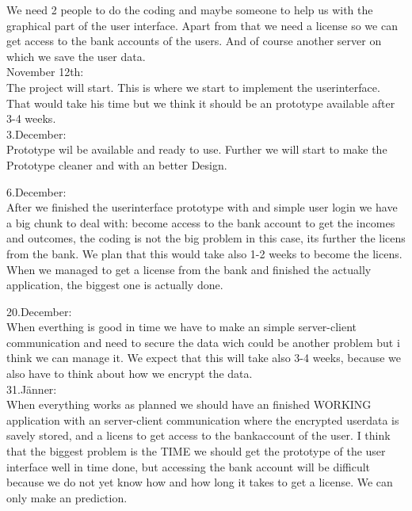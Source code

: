 \documentclass[12pt]{article}
\theoremstyle{definition}
\begin{document}
We need 2 people to do the coding and maybe someone to help us with the graphical part of the user interface. Apart from that we need a license so we can get access to the bank accounts of the users.
And of course another server on which we save the user data.
\\

November 12th:
\\

The project will start. This is where we start to implement the userinterface. That would take his time but we think it should be an prototype available after 3-4 weeks.
\\

3.December:
\\

Prototype wil be available and ready to use. Further we will start to make the Prototype cleaner and with an better Design.

6.December:
\\

After we finished the userinterface prototype with and simple user login we have a big chunk to deal with: become access to the bank account to get the incomes and outcomes, the coding is not the big problem in this case, its further the licens from the bank.
We plan that this would take also 1-2 weeks to become the licens.
When we managed to get a license from the bank and finished the actually application, the biggest one is actually done.
\\
\pagebreak

20.December:
\\

When everthing is good in time we have to make an simple server-client communication and need to secure the data wich could be another problem but i think we can manage it. We expect that this will take also 3-4 weeks, because 
we also have to think about how we encrypt the data.
\\

31.Jänner:
\\

When everything works as planned we should have an finished WORKING application with an server-client communication where the encrypted userdata is savely stored, and a licens to get access to the bankaccount of the user.
I think that the biggest problem is the TIME we should get the prototype of the user interface well in time done, but accessing the bank account will be difficult because we do not yet know how and how long it takes to get a license. We can only make an prediction.
\end{document}
